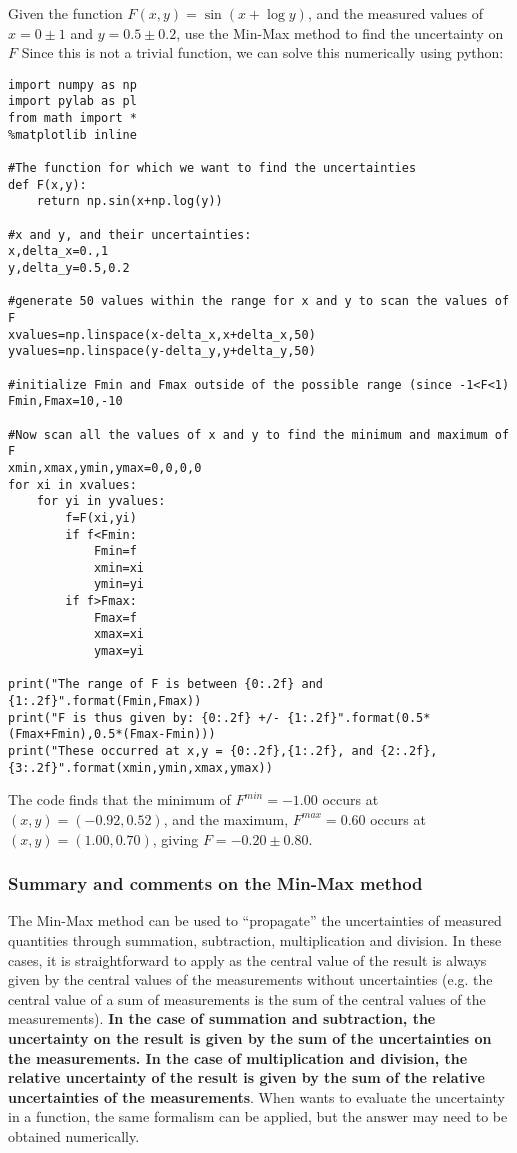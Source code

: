 \begin{example}{}{Given the function $F(x,y)=\sin(x+\log y)$, and the measured values of $x=0\pm1$ and $y=0.5\pm0.2$, use the Min-Max method to find the uncertainty on $F$}{}
Since this is not a trivial function, we can solve this numerically using python:

\begin{lstlisting}[frame=single] 
import numpy as np
import pylab as pl
from math import *
%matplotlib inline

#The function for which we want to find the uncertainties
def F(x,y):
    return np.sin(x+np.log(y))

#x and y, and their uncertainties:
x,delta_x=0.,1
y,delta_y=0.5,0.2

#generate 50 values within the range for x and y to scan the values of F
xvalues=np.linspace(x-delta_x,x+delta_x,50)
yvalues=np.linspace(y-delta_y,y+delta_y,50)

#initialize Fmin and Fmax outside of the possible range (since -1<F<1)
Fmin,Fmax=10,-10

#Now scan all the values of x and y to find the minimum and maximum of F
xmin,xmax,ymin,ymax=0,0,0,0
for xi in xvalues:
    for yi in yvalues:
        f=F(xi,yi)
        if f<Fmin:
            Fmin=f
            xmin=xi
            ymin=yi
        if f>Fmax:
            Fmax=f
            xmax=xi
            ymax=yi
            
print("The range of F is between {0:.2f} and {1:.2f}".format(Fmin,Fmax))
print("F is thus given by: {0:.2f} +/- {1:.2f}".format(0.5*(Fmax+Fmin),0.5*(Fmax-Fmin)))
print("These occurred at x,y = {0:.2f},{1:.2f}, and {2:.2f},{3:.2f}".format(xmin,ymin,xmax,ymax))
\end{lstlisting}

The code finds that the minimum of $F^{min}=-1.00$ occurs at $(x,y)=(-0.92,0.52)$, and the maximum, $F^{max}=0.60$ occurs at $(x,y)=(1.00,0.70)$, giving $F=-0.20\pm0.80$.
\end{example}

\subsubsection{Summary and comments on the Min-Max method}
The Min-Max method can be used to ``propagate'' the uncertainties of measured quantities through summation, subtraction, multiplication and division. In these cases, it is straightforward to apply as the central value of the result is always given by the central values of the measurements without uncertainties (e.g. the central value of a sum of measurements is the sum of the central values of the measurements). \textbf{In the case of summation and subtraction, the uncertainty on the result is given by the sum of the uncertainties on the measurements. In the case of multiplication and division, the relative uncertainty of the result is given by the sum of the relative uncertainties of the measurements}. When wants to evaluate the uncertainty in a function, the same formalism can be applied, but the answer may need to be obtained numerically.

